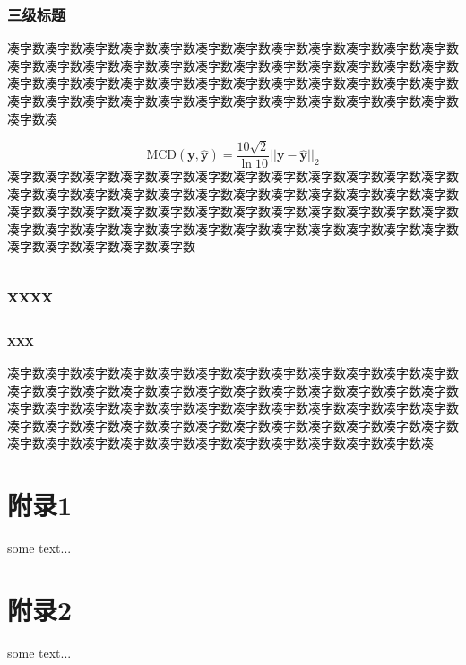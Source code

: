 \subsubsection{三级标题}
凑字数凑字数凑字数凑字数凑字数凑字数凑字数凑字数凑字数凑字数凑字数凑字数凑字数凑字数凑字数凑字数凑字数凑字数凑字数凑字数凑字数凑字数凑字数凑字数凑字数凑字数凑字数凑字数凑字数凑字数凑字数凑字数凑字数凑字数凑字数凑字数凑字数凑字数凑字数凑字数凑字数凑字数凑字数凑字数凑字数凑字数凑字数凑字数凑字数凑\par
\begin{equation}
    \mathrm{MCD}(\boldsymbol{y},\boldsymbol{\hat{y}})=\frac{10\sqrt{2}}{\ln10}||\boldsymbol{y}-\boldsymbol{\hat{y}}||_2
\end{equation}
凑字数凑字数凑字数凑字数凑字数凑字数凑字数凑字数凑字数凑字数凑字数凑字数凑字数凑字数凑字数凑字数凑字数凑字数凑字数凑字数凑字数凑字数凑字数凑字数凑字数凑字数凑字数凑字数凑字数凑字数凑字数凑字数凑字数凑字数凑字数凑字数凑字数凑字数凑字数凑字数凑字数凑字数凑字数凑字数凑字数凑字数凑字数凑字数凑字数凑字数凑字数凑字数凑字数\par
\subsection{xxxx}
\subsubsection{xxx}
凑字数凑字数凑字数凑字数凑字数凑字数凑字数凑字数凑字数凑字数凑字数凑字数凑字数凑字数凑字数凑字数凑字数凑字数凑字数凑字数凑字数凑字数凑字数凑字数凑字数凑字数凑字数凑字数凑字数凑字数凑字数凑字数凑字数凑字数凑字数凑字数凑字数凑字数凑字数凑字数凑字数凑字数凑字数凑字数凑字数凑字数凑字数凑字数凑字数凑字数凑字数凑字数凑字数凑字数凑字数凑字数凑字数凑字数凑字数凑



\newpage
\appendix
\section{附录1}
some text...
\section{附录2}
some text...
